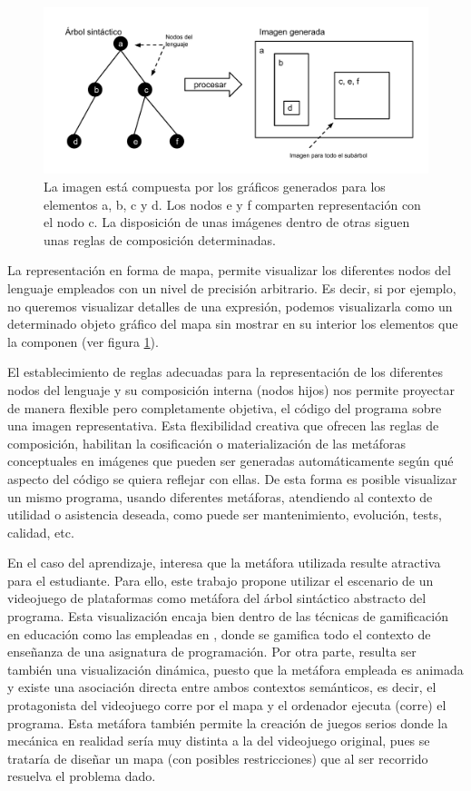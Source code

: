 \documentclass{llncs}
\begin{document}
\begin{figure}[ht]
\begin{center}
\includegraphics[scale=0.5]{images/arbol-mapa.pdf}
\caption{La imagen está compuesta por los gráficos generados para los elementos a, b, c y d. Los nodos e y f comparten representación con el nodo c. La disposición de unas imágenes dentro de otras siguen unas reglas de composición determinadas.
\label{fig:arbolmapa}}
\end{center}
\end{figure}

La representación en forma de mapa, permite visualizar los diferentes nodos del lenguaje empleados con un nivel de precisión arbitrario. Es decir, si por ejemplo, no queremos visualizar detalles de una expresión, podemos visualizarla como un determinado objeto gráfico del mapa sin mostrar en su interior los elementos que la componen (ver figura \ref{fig:arbolmapa}).

El establecimiento de reglas adecuadas para la representación de los diferentes nodos del lenguaje y su composición interna (nodos hijos) nos permite proyectar de manera flexible pero completamente objetiva, el código del programa sobre una imagen representativa. Esta flexibilidad creativa que ofrecen las reglas de composición, habilitan la cosificación o materialización de las metáforas conceptuales en imágenes que pueden ser generadas automáticamente según qué aspecto del código se quiera reflejar con ellas. De esta forma es posible visualizar un mismo programa, usando diferentes metáforas, atendiendo al contexto de utilidad o asistencia deseada, como puede ser mantenimiento, evolución, tests, calidad, etc.

En el caso del aprendizaje, interesa que la metáfora utilizada resulte atractiva para el estudiante. Para ello, este trabajo propone utilizar el escenario de un videojuego de plataformas como metáfora del árbol sintáctico abstracto del programa. Esta visualización encaja bien dentro de las técnicas de gamificación en educación como las empleadas en \cite{kumar2012gamification}, donde se gamifica todo el contexto de enseñanza de una asignatura de programación. Por otra parte, resulta ser también una visualización dinámica, puesto que la metáfora empleada es animada y existe una asociación directa entre ambos contextos semánticos, es decir, el protagonista del videojuego corre por el mapa y el ordenador ejecuta (corre) el programa. Esta metáfora también permite la creación de juegos serios donde la mecánica en realidad sería muy distinta a la del videojuego original, pues se trataría de diseñar un mapa (con posibles restricciones) que al ser recorrido resuelva el problema dado.
\end{document}
